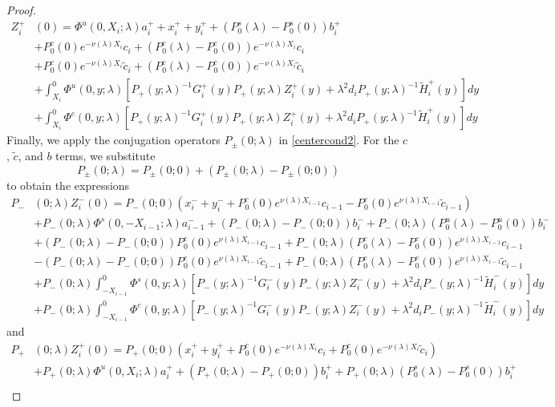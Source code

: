 \documentclass[thesis.tex]{subfiles}
\begin{document}
\begin{lemma}
\begin{proof}
\begin{align*}
Z_i^+&(0) = \Phi^u(0, X_i; \lambda) a_i^+ + x_i^+ + y_i^+ + (P_0^s(\lambda) - P_0^s(0)) b_i^+ \\
&+ P_0^c(0) e^{-\nu(\lambda)X_i} c_i + (P_0^c(\lambda) - P_0^c(0)) e^{-\nu(\lambda)X_i} c_i \\
&+ P_0^c(0) e^{-\nu(\lambda)X_i} \tilde{c}_i + (P_0^c(\lambda) - P_0^c(0)) e^{-\nu(\lambda)X_i} \tilde{c}_i \\
&+ \int_{X_i}^0 \Phi^u(0, y; \lambda) [P_+(y; \lambda)^{-1} G_i^+(y) P_+(y; \lambda) Z_i^+(y) + \lambda^2 d_i P_+(y; \lambda)^{-1} \tilde{H}_i^+(y)] dy \\
&+ \int_{X_i}^0 \Phi^c(0, y; \lambda) [P_+(y; \lambda)^{-1} G_i^+(y) P_+(y; \lambda) Z_i^+(y) + \lambda^2 d_i P_+(y; \lambda)^{-1} \tilde{H}_i^+(y)] dy 
\end{align*}
Finally, we apply the conjugation operators $P_\pm(0; \lambda)$ in \eqref{centercond2}. For the $c$, $\tilde{c}$, and $b$ terms, we substitute
\[
P_\pm(0; \lambda) = P_\pm(0; 0) + (P_\pm(0; \lambda) - P_\pm(0; 0))
\]
to obtain the expressions
\begin{align*}
P_-&(0; \lambda) Z_i^-(0) = P_-(0; 0)( x_i^- + y_i^- + P_0^c(0) e^{\nu(\lambda) X_{i-1}} c_{i-1} - P_0^c(0) e^{\nu(\lambda) X_{i-1}} \tilde{c}_{i-1} ) \\
&+ P_-(0; \lambda) \Phi^s(0, -X_{i-1}; \lambda) a_{i-1}^- + (P_-(0; \lambda) - P_-(0; 0))b_i^- + P_-(0; \lambda)(P_0^u(\lambda) - P_0^u(0))b_i^- \\
&+ (P_-(0; \lambda) - P_-(0; 0)) P_0^c(0) e^{\nu(\lambda) X_{i-1}} c_{i-1} + P_-(0; \lambda) (P_0^c(\lambda) - P_0^c(0)) e^{\nu(\lambda) X_{i-1}} c_{i-1} \\
&- (P_-(0; \lambda) - P_-(0; 0)) P_0^c(0) e^{\nu(\lambda) X_{i-1}} \tilde{c}_{i-1} + P_-(0; \lambda) (P_0^c(\lambda) - P_0^c(0)) e^{\nu(\lambda) X_{i-1}} \tilde{c}_{i-1} \\
&+ P_-(0; \lambda) \int_{-X_{i-1}}^0 \Phi^s(0, y; \lambda) [P_-(y; \lambda)^{-1} G_i^-(y) P_-(y; \lambda)Z_i^-(y) + \lambda^2 d_i P_-(y; \lambda)^{-1} \tilde{H}_i^-(y)] dy \\
&+ P_-(0; \lambda) \int_{-X_{i-1}}^0 \Phi^c(0, y; \lambda) [P_-(y; \lambda)^{-1} G_i^-(y) P_-(y; \lambda)Z_i^-(y) + \lambda^2 d_i P_-(y; \lambda)^{-1} \tilde{H}_i^-(y)] dy 
\end{align*}
and
\begin{align*}
P_+&(0; \lambda) Z_i^+(0) = P_+(0; 0)( x_i^+ + y_i^+ + P_0^c(0) e^{-\nu(\lambda)X_i} c_i + P_0^c(0) e^{-\nu(\lambda)X_i} \tilde{c}_i )\\
&+ P_+(0; \lambda) \Phi^u(0, X_i; \lambda) a_i^+ + (P_+(0; \lambda) - P_+(0; 0)) b_i^+ + P_+(0; \lambda) (P_0^s(\lambda) - P_0^s(0)) b_i^+ \\

\end{align*}
\end{proof}
\end{lemma}
\end{document}

